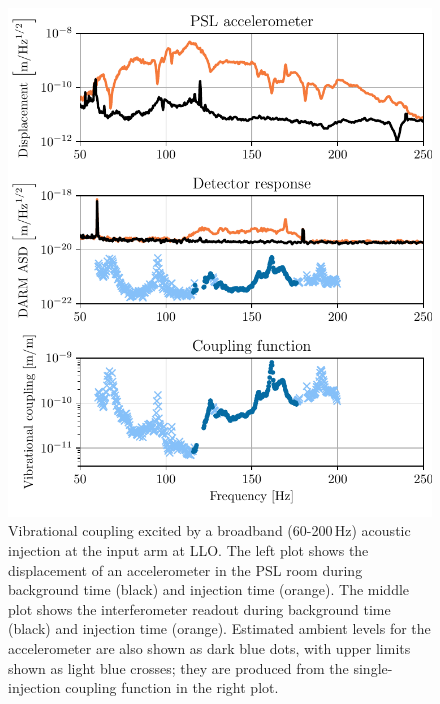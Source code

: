 \begin{figure}
	\centering
	\includegraphics[width=\textwidth]{figures/injection-example.pdf}
	\caption{
		Vibrational coupling excited by a broadband (60-200\,Hz) acoustic injection at the input arm at \ac{LLO}.
		The left plot shows the displacement of an accelerometer in the \ac{PSL} room during background time (black) and injection time (orange).
		The middle plot shows the interferometer readout during background time (black) and injection time (orange).
		Estimated ambient levels for the accelerometer are also shown as dark blue dots, with upper limits shown as light blue crosses; they are produced from the single-injection coupling function in the right plot.}
	\label{fig:injection}
\end{figure}

